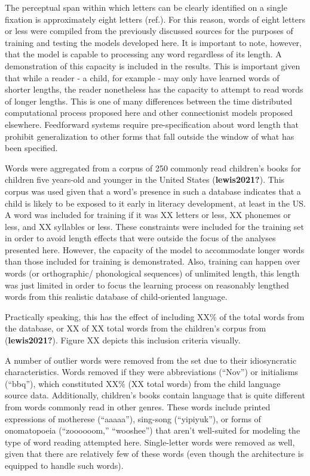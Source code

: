 \documentclass[
  american,
  man,floatsintext]{apa6}
\begin{document}
The perceptual span within which letters can be clearly identified on a single fixation is approximately eight letters (ref.). For this reason, words of eight letters or less were compiled from the previously discussed sources for the purposes of training and testing the models developed here. It is important to note, however, that the model is capable to processing any word regardless of its length. A demonstration of this capacity is included in the results. This is important given that while a reader - a child, for example - may only have learned words of shorter lengths, the reader nonetheless has the capacity to attempt to read words of longer lengths. This is one of many differences between the time distributed computational process proposed here and other connectionist models proposed elsewhere. Feedforward systems require pre-specification about word length that prohibit generalization to other forms that fall outside the window of what has been specified.

Words were aggregated from a corpus of 250 commonly read children's books for children five years-old and younger in the United States (\textbf{lewis2021?}). This corpus was used given that a word's presence in such a database indicates that a child is likely to be exposed to it early in literacy development, at least in the US. A word was included for training if it was XX letters or less, XX phonemes or less, and XX syllables or less. These constraints were included for the training set in order to avoid length effects that were outside the focus of the analyses presented here. However, the capacity of the model to accommodate longer words than those included for training is demonstrated. Also, training can happen over words (or orthographic/ phonological sequences) of unlimited length, this length was just limited in order to focus the learning process on reasonably lengthed words from this realistic database of child-oriented language.

Practically speaking, this has the effect of including XX\% of the total words from the database, or XX of XX total words from the children's corpus from (\textbf{lewis2021?}). Figure XX depicts this inclusion criteria visually.

A number of outlier words were removed from the set due to their idiosyncratic characteristics. Words removed if they were abbreviations (``Nov'') or initialisms (``bbq''), which constituted XX\% (XX total words) from the child language source data. Additionally, children's books contain language that is quite different from words commonly read in other genres. These words include printed expressions of motherese (``aaaaa''), sing-song (``yipiyuk''), or forms of onomatopoeia (``zoooooom,'' ``wooshee'') that aren't well-suited for modeling the type of word reading attempted here. Single-letter words were removed as well, given that there are relatively few of these words (even though the architecture is equipped to handle such words).
\end{document}

